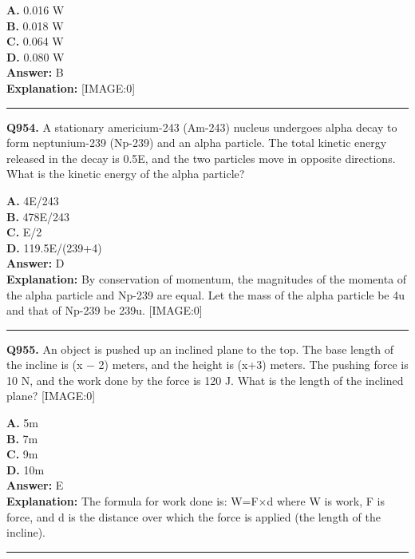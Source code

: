 \documentclass[12pt]{article}
\begin{document}
\textbf{A.} 0.016 W \\
\textbf{B.} 0.018 W \\
\textbf{C.} 0.064 W \\
\textbf{D.} 0.080 W \\

\textbf{Answer:} B \\
\textbf{Explanation:} [IMAGE:0]

\hrule
\vspace{1em}


\noindent
\textbf{Q954.} A stationary americium-243 (Am-243) nucleus undergoes alpha decay to form neptunium-239 (Np-239) and an alpha particle. The total kinetic energy released in the decay is 0.5E, and the two particles move in opposite directions. What is the kinetic energy of the alpha particle?



\textbf{A.} 4E/243 \\
\textbf{B.} 478E/243 \\
\textbf{C.} E/2 \\
\textbf{D.} 119.5E/(239+4) \\

\textbf{Answer:} D \\
\textbf{Explanation:} By conservation of momentum, the magnitudes of the momenta of the alpha particle and Np-239 are equal. Let the mass of the alpha particle be 4u and that of Np-239 be 239u.
[IMAGE:0]

\hrule
\vspace{1em}


\noindent
\textbf{Q955.} An object is pushed up an inclined plane to the top. The base length of the incline is (x
−
2) meters, and the height is (x+3) meters. The pushing force is 10 N, and the work done by the force is 120 J. What is the length of the inclined plane?
[IMAGE:0]



\textbf{A.} 5m \\
\textbf{B.} 7m \\
\textbf{C.} 9m \\
\textbf{D.} 10m \\

\textbf{Answer:} E \\
\textbf{Explanation:} The formula for work done is:
W=F×d
where W is work, F is force, and d is the distance over which the force is applied (the length of the incline).

\hrule
\vspace{1em}
\end{document}
